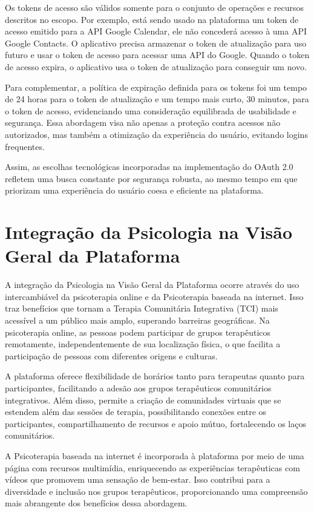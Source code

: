Os tokens de acesso são válidos somente para o conjunto de operações e recursos descritos no escopo. Por exemplo, está sendo usado na plataforma um token de acesso emitido para a API Google Calendar, ele não concederá acesso à uma API Google Contacts. O aplicativo precisa armazenar o token de atualização para uso futuro e usar o token de acesso para acessar uma API do Google. Quando o token de acesso expira, o aplicativo usa o token de atualização para conseguir um novo.

Para complementar, a política de expiração definida para os tokens foi um tempo de 24 horas para o token de atualização e um tempo mais curto, 30 minutos, para o token de acesso, evidenciando uma consideração equilibrada de usabilidade e segurança. Essa abordagem visa não apenas a proteção contra acessos não autorizados, mas também a otimização da experiência do usuário, evitando logins frequentes.

Assim, as escolhas tecnológicas incorporadas na implementação do OAuth 2.0 refletem uma busca constante por segurança robusta, ao mesmo tempo em que priorizam uma experiência do usuário coesa e eficiente na plataforma.


\chapter{Integração da Psicologia na Visão Geral da Plataforma}
A integração da Psicologia na Visão Geral da Plataforma ocorre através do uso intercambiável da psicoterapia online e da Psicoterapia baseada na internet. Isso traz benefícios que tornam a Terapia Comunitária Integrativa (TCI) mais acessível a um público mais amplo, superando barreiras geográficas. Na psicoterapia online, as pessoas podem participar de grupos terapêuticos remotamente, independentemente de sua localização física, o que facilita a participação de pessoas com diferentes origens e culturas.

A plataforma oferece flexibilidade de horários tanto para terapeutas quanto para participantes, facilitando a adesão aos grupos terapêuticos comunitários integrativos. Além disso, permite a criação de comunidades virtuais que se estendem além das sessões de terapia, possibilitando conexões entre os participantes, compartilhamento de recursos e apoio mútuo, fortalecendo os laços comunitários.

A Psicoterapia baseada na internet é incorporada à plataforma por meio de uma página com recursos multimídia, enriquecendo as experiências terapêuticas com vídeos que promovem uma sensação de bem-estar. Isso contribui para a diversidade e inclusão nos grupos terapêuticos, proporcionando uma compreensão mais abrangente dos benefícios dessa abordagem.

